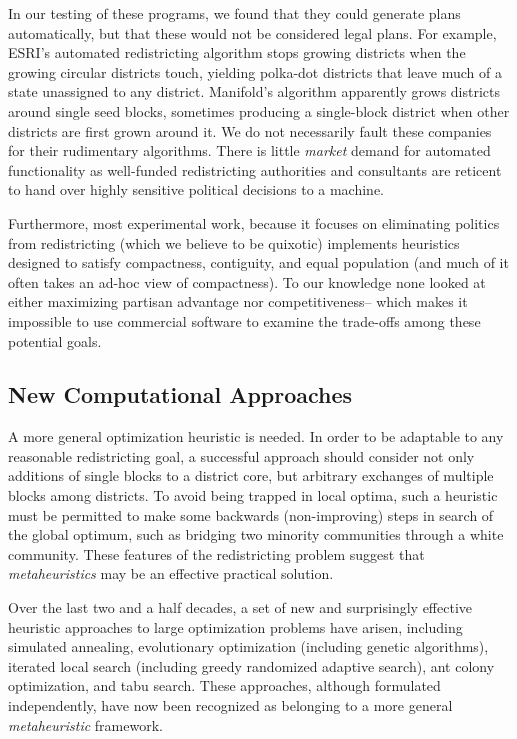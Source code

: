 \documentclass[article]{JSSstyle/jss}
\begin{document}
In our testing of these programs, we found that they could generate 
plans automatically, but that these would not be considered legal plans.  
For example, ESRI's automated redistricting algorithm stops growing districts when the 
growing circular districts touch, yielding polka-dot districts that leave much of a state 
unassigned to any district.  Manifold's algorithm apparently grows districts around single seed blocks, sometimes producing a single-block district when other districts are first grown around it.  We do not 
necessarily fault these companies for their rudimentary algorithms.  
There is little \emph{market} demand for automated functionality as 
well-funded redistricting authorities and consultants are reticent to hand over highly sensitive political decisions to a machine.

Furthermore, most experimental work, because it focuses on eliminating politics 
from redistricting (which we believe to be quixotic) implements 
heuristics designed to satisfy compactness, contiguity, and equal 
population (and much of it often takes an ad-hoc view of compactness).  
To our knowledge none looked at either maximizing partisan advantage 
nor competitiveness-- which makes it impossible to use commercial software to 
examine the trade-offs among these potential goals.

\subsection{New Computational Approaches} 

A more general optimization heuristic is needed. In order to be adaptable to any
reasonable redistricting goal, a successful approach should consider not only additions 
of single blocks to a district core, but arbitrary exchanges of multiple blocks among districts.  
To avoid being trapped in local optima, such  a heuristic must be permitted to make 
some backwards (non-improving) steps in search of 
the global optimum, such as bridging two minority communities 
through a white community. These features of the redistricting problem suggest that \emph{metaheuristics} may be an effective practical solution.
 
Over the last two and a half decades, a set of new and surprisingly 
effective heuristic approaches to large optimization problems have 
arisen, including simulated annealing, evolutionary optimization 
(including genetic algorithms), iterated local search (including 
greedy randomized adaptive search), ant colony optimization, and 
tabu search.  These approaches, although formulated independently, 
have now been recognized as belonging to a more general \emph{metaheuristic} framework.
\end{document}
